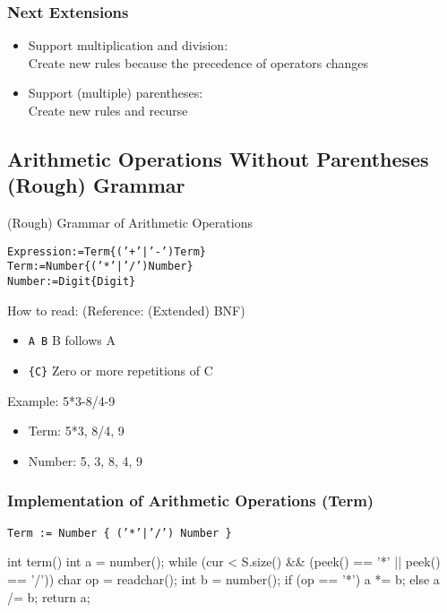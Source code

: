 \subsubsection{Next Extensions}
  \begin{itemize}
\setlength{\itemsep}{0pt}
  \item Support multiplication and division: \\
    Create new rules because the precedence of operators changes
  \item Support (multiple) parentheses: \\
    Create new rules and recurse
  \end{itemize}
\subsection{Arithmetic Operations Without Parentheses (Rough) Grammar}

\begin{itembox}[l]{(Rough) Grammar of Arithmetic Operations}
  \begin{alltt}
Expression := Term \{ ('+'|'-') Term \}
Term := Number \{ ('*'|'/') Number \}
Number := Digit \{ Digit \}
\end{alltt}
\end{itembox}

How to read: (Reference: (Extended) BNF)
\begin{itemize}
\setlength{\itemsep}{0pt}
\item \texttt{A B} \dingright B follows A
\item \texttt{\{C\}} \dingright Zero or more repetitions of C
\end{itemize}

Example: 5*3-8/4-9
\begin{itemize}
\setlength{\itemsep}{0pt}
\item Term: 5*3, 8/4, 9
\item Number: 5, 3, 8, 4, 9
\end{itemize}

\subsubsection{Implementation of Arithmetic Operations (Term)}
\texttt{\textcolor{ired}{Term := Number \{ ('*'|'/') Number \}}}

  \begin{cbox}[emph={term},emph={[2]number,*,/}]
int term() {
  int a = number();
  while (cur < S.size() 
        && (peek() == '*' || peek() == '/')) {
    char op = readchar();
    int b = number();
    if (op == '*') a *= b; else a /= b;
  }
  return a;
}
\end{cbox}

